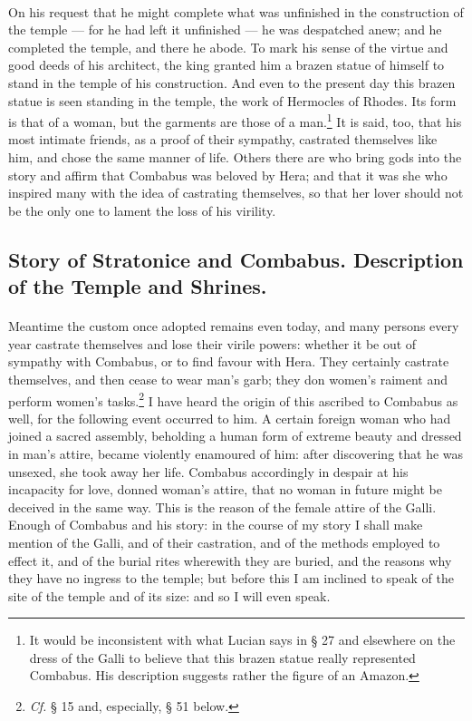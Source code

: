 \documentclass[a4paper, 11pt, oneside, polutonikogreek, english]{article}
\begin{document}
\paragraph{}
On his request that he might complete what was unfinished in the construction of the temple --- for he had left it unfinished --- he was despatched anew; and he completed the temple, and there he abode. To mark his sense of the virtue and good deeds of his architect, the king granted him a brazen statue of himself to stand in the temple of his construction. And even to the present day this brazen statue is seen standing in the temple, the work of Hermocles of Rhodes. Its form is that of a woman, but the garments are those of a man.\footnote{It would be inconsistent with what Lucian says in § 27 and elsewhere on the dress of the Galli to believe that this brazen statue really represented Combabus. His description suggests rather the figure of an Amazon.} It is said, too, that his most intimate friends, as a proof of their sympathy, castrated themselves like him, and chose the same manner of life. Others there are who bring gods into the story and affirm that Combabus was beloved by Hera; and that it was she who inspired many with the idea of castrating themselves, so that her lover should not be the only one to lament the loss of his virility.

\subsection{Story of Stratonice and Combabus. Description of the Temple and Shrines.}
\paragraph{}
Meantime the custom once adopted remains even today, and many persons every year castrate themselves and lose their virile powers: whether it be out of sympathy with Combabus, or to find favour with Hera. They certainly castrate themselves, and then cease to wear man's garb; they don women's raiment and perform women's tasks.\footnote{\emph{Cf.} § 15 and, especially, § 51 below.} I have heard the origin of this ascribed to Combabus as well, for the following event occurred to him. A certain foreign woman who had joined a sacred assembly, beholding a human form of extreme beauty and dressed in man's attire, became violently enamoured of him: after discovering that he was unsexed, she took away her life. Combabus accordingly in despair at his incapacity for love, donned woman's attire, that no woman in future might be deceived in the same way. This is the reason of the female attire of the Galli. Enough of Combabus and his story: in the course of my story I shall make mention of the Galli, and of their castration, and of the methods employed to effect it, and of the burial rites wherewith they are buried, and the reasons why they have no ingress to the temple; but before this I am inclined to speak of the site of the temple and of its size: and so I will even speak.
\end{document}
